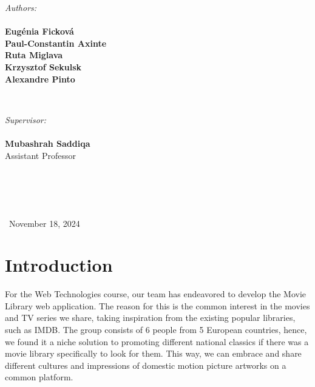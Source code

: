 \documentclass[letterpaper,twocolumn]{article}
\begin{document}
\begin{titlepage}
\begin{minipage}{0.4\textwidth}
\begin{flushleft} \large
\emph{Authors:}
\\\textbf{}
\\\textbf{Eugénia Ficková}
\\\textbf{Paul-Constantin Axinte}
\\\textbf{Ruta Miglava}
\\\textbf{Krzysztof Sekulsk}
\\\textbf{Alexandre Pinto}


\end{flushleft}
\end{minipage}
~
\begin{minipage}{0.4\textwidth}
\begin{flushright} \large
\emph{Supervisor:} 
\\\textbf{}
\\\textbf{Mubashrah Saddiqa}
\\Assistant Professor
\\\textbf{}
\\\textbf{}
\\\textbf{}
\\\textbf{}


\end{flushright}
\end{minipage}\\[3cm]




\centering
\large \ November 18, 2024


\vfill %

\end{titlepage}




\section{Introduction}

For the Web Technologies course, our team has endeavored to develop the Movie Library web application. The reason for this is the common interest in the movies and TV series we share, taking inspiration from the existing popular libraries, such as IMDB. The group consists of 6 people from 5 European countries, hence, we found it a niche solution to promoting different national classics if there was a movie library specifically to look for them.  This way, we can embrace and share different cultures and impressions of domestic motion picture artworks on a common platform.
\end{document}
